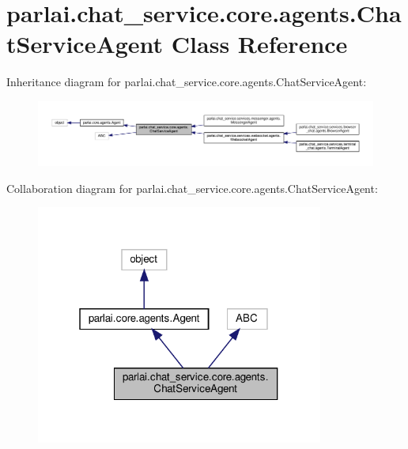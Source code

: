 \hypertarget{classparlai_1_1chat__service_1_1core_1_1agents_1_1ChatServiceAgent}{}\section{parlai.\+chat\+\_\+service.\+core.\+agents.\+Chat\+Service\+Agent Class Reference}
\label{classparlai_1_1chat__service_1_1core_1_1agents_1_1ChatServiceAgent}


Inheritance diagram for parlai.\+chat\+\_\+service.\+core.\+agents.\+Chat\+Service\+Agent\+:
\nopagebreak
\begin{figure}[H]
\begin{center}
\leavevmode
\includegraphics[width=350pt]{d7/df5/classparlai_1_1chat__service_1_1core_1_1agents_1_1ChatServiceAgent__inherit__graph}
\end{center}
\end{figure}


Collaboration diagram for parlai.\+chat\+\_\+service.\+core.\+agents.\+Chat\+Service\+Agent\+:
\nopagebreak
\begin{figure}[H]
\begin{center}
\leavevmode
\includegraphics[width=268pt]{d9/daa/classparlai_1_1chat__service_1_1core_1_1agents_1_1ChatServiceAgent__coll__graph}
\end{center}
\end{figure}
